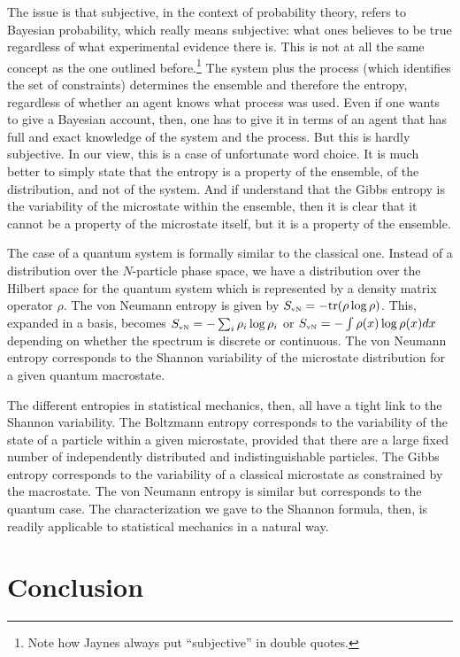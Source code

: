 \documentclass[iopart]{revtex4-1}
\begin{document}
The issue is that subjective, in the context of probability theory, refers to Bayesian probability, which really means subjective: what ones believes to be true regardless of what experimental evidence there is. This is not at all the same concept as the one outlined before.\footnote{Note how Jaynes\cite{Jaynes2} always put ``subjective'' in double quotes.} The system plus the process (which identifies the set of constraints) determines the ensemble and therefore the entropy, regardless of whether an agent knows what process was used. Even if one wants to give a Bayesian account, then, one has to give it in terms of an agent that has full and exact knowledge of the system and the process. But this is hardly subjective. In our view, this is a case of unfortunate word choice. It is much better to simply state that the entropy is a property of the ensemble, of the distribution, and not of the system. And if understand that the Gibbs entropy is the variability of the microstate within the ensemble, then it is clear that it cannot be a property of the microstate itself, but it is a property of the ensemble.

The case of a quantum system is formally similar to the classical one. Instead of a distribution over the $N$-particle phase space, we have a distribution over the Hilbert space for the quantum system which is represented by a density matrix operator $\rho$. The von Neumann entropy is given by $S_\textrm{\tiny{vN}} = - \textrm{tr}(\rho \log \rho)$. This, expanded in a basis, becomes $S_\textrm{\tiny{vN}} = - \sum_i \rho_i \log \rho_i$ or $S_\textrm{\tiny{vN}} = - \int \rho(x) \log \rho(x)dx$ depending on whether the spectrum is discrete or continuous.  The von Neumann entropy corresponds to the Shannon variability of the microstate distribution for a given quantum macrostate.

The different entropies in statistical mechanics, then, all have a tight link to the Shannon variability. The Boltzmann entropy corresponds to the variability of the state of a particle within a given microstate, provided that there are a large fixed number of independently distributed and indistinguishable particles. The Gibbs entropy corresponds to the variability of a classical microstate as constrained by the macrostate. The von Neumann entropy is similar but corresponds to the quantum case. The characterization we gave to the Shannon formula, then, is readily applicable to statistical mechanics in a natural way. 

\section{Conclusion}
\end{document}
